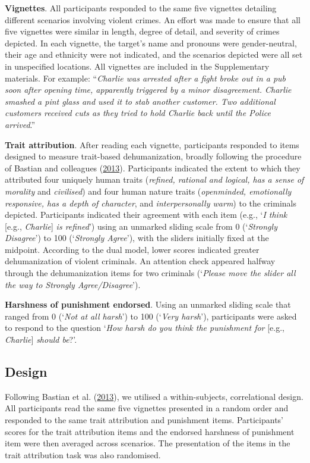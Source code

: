 \documentclass[
]{article}
\begin{document}
\textbf{Vignettes}. All participants responded to the same five vignettes detailing different scenarios involving violent crimes. An effort was made to ensure that all five vignettes were similar in length, degree of detail, and severity of crimes depicted. In each vignette, the target's name and pronouns were gender-neutral, their age and ethnicity were not indicated, and the scenarios depicted were all set in unspecified locations. All vignettes are included in the Supplementary materials. For example: ``\emph{Charlie was arrested after a fight broke out in a pub soon after opening time, apparently triggered by a minor disagreement. Charlie smashed a pint glass and used it to stab another customer. Two additional customers received cuts as they tried to hold Charlie back until the Police arrived}.''

\textbf{Trait attribution}. After reading each vignette, participants responded to items designed to measure trait-based dehumanization, broadly following the procedure of Bastian and colleagues (\protect\hyperlink{ref-Bastian2013}{2013}). Participants indicated the extent to which they attributed four uniquely human traits (\emph{refined, rational and logical, has a sense of morality} and \emph{civilised}) and four human nature traits (\emph{openminded, emotionally responsive, has a depth of character}, and \emph{interpersonally warm}) to the criminals depicted. Participants indicated their agreement with each item (e.g., `\emph{I think} {[}e.g., \emph{Charlie}{]} \emph{is refined}') using an unmarked sliding scale from 0 (`\emph{Strongly Disagree}') to 100 (`\emph{Strongly Agree}'), with the sliders initially fixed at the midpoint. According to the dual model, lower scores indicated greater dehumanization of violent criminals. An attention check appeared halfway through the dehumanization items for two criminals (`\emph{Please move the slider all the way to Strongly Agree/Disagree}').

\textbf{Harshness of punishment endorsed}. Using an unmarked sliding scale that ranged from 0 (`\emph{Not at all harsh}') to 100 (`\emph{Very harsh}'), participants were asked to respond to the question `\emph{How harsh do you think the punishment for} {[}e.g., \emph{Charlie}{]} \emph{should be}?'.

\hypertarget{design}{%
\subsection{Design}\label{design}}

Following Bastian et al. (\protect\hyperlink{ref-Bastian2013}{2013}), we utilised a within-subjects, correlational design. All participants read the same five vignettes presented in a random order and responded to the same trait attribution and punishment items. Participants' scores for the trait attribution items and the endorsed harshness of punishment item were then averaged across scenarios. The presentation of the items in the trait attribution task was also randomised.
\end{document}
